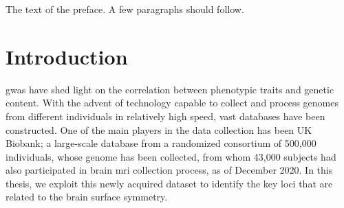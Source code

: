 \documentclass[master=ebin]{kulemt}
\begin{document}
	\begin{preface}
		The text of the preface. A few paragraphs should follow.
	\end{preface}
\tableofcontents*
\cleardoublepage
{}
\printacronyms[name=Abbreviations]
\begin{abstract}
	Overall purpose of this thesis is to complement the existing bibliography on the detection and examination of the genetic associations of brain shape asymmetry. Asymmetry components  are computed based on the  brain MRI dataset provided by UK Biobank database. A data-driven approach is followed, where the brain surface is partitioned in an unsupervised manner, through Hierarchical Spectral Clustering, a technique that allows for  a coarse-to-fine segmentation. Aggregated asymmetry measurements are retrieved from the segments, whose genetic correlation is examined through a \ac{mvgwas} statistical analysis. Recognized significant \acp{snp} are then analyzed individually or in groups, through comparison with existing results and databases.  The genetic overlap with neurodevelopmental disorders and traits, that have been reported to exhibit phenotypic associations with brain structure asymmetry, such as Autism, Alzheimer’s Disease or intelligence, are examined. Functional annotations of variants associated with the genes where significant SNPs were detected are constructed, offering an insight into the functional reasoning behind the brain shape asymmetry existence. Further comparisons with other past human phenotypic characteristics studies are lastly applied.
\end{abstract}
\mainmatter
\chapter{Introduction}

\ac{gwas} have shed light on the correlation between phenotypic traits and genetic content. With the advent of technology capable to collect and process genomes from different individuals in relatively high speed, vast databases have been constructed. One of the main players in the data collection has been UK Biobank; a large-scale database from a randomized consortium of 500,000 individuals, whose genome has been collected, from whom  43,000 subjects had also participated in brain \ac{mri} collection process, as of December 2020. In this thesis, we exploit this newly acquired dataset to identify the key loci that are related to the brain surface symmetry. 
\end{document}
